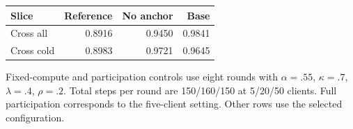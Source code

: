 \par\noindent\begin{minipage}{\columnwidth}\centering\footnotesize
{}\label{tab:drift}
\setlength{\tabcolsep}{2.5pt}
\begin{tabular*}{\linewidth}{@{\extracolsep{\fill}}lrrr@{}}
\toprule
Slice & Reference & No anchor & Base \\
\midrule
Cross all & 0.8916 & 0.9450 & 0.9841 \\
Cross cold & 0.8983 & 0.9721 & 0.9645 \\
\bottomrule
\end{tabular*}
\end{minipage}\par\addvspace{6pt}
\noindent Fixed-compute and participation controls use eight rounds with $\alpha=.55$, $\kappa=.7$, $\lambda=.4$, $\rho=.2$. Total steps per round are 150/160/150 at 5/20/50 clients. Full participation corresponds to the five-client setting. Other rows use the selected configuration.\par






